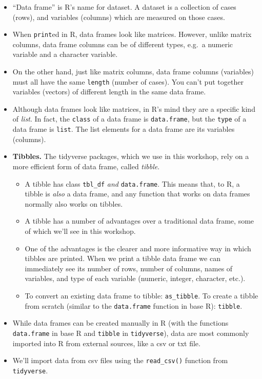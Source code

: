 \documentclass[
]{book}
\providecommand{\tightlist}{%
  \setlength{\itemsep}{0pt}\setlength{\parskip}{0pt}}
\begin{document}
\begin{itemize}
\tightlist
\item
  ``Data frame'' is R's name for dataset. A dataset is a collection of cases (rows), and variables (columns) which are measured on those cases.
\item
  When \texttt{print}ed in R, data frames look like matrices. However, unlike matrix columns, data frame columns can be of different types, e.g.~a numeric variable and a character variable.
\item
  On the other hand, just like matrix columns, data frame columns (variables) must all have the same \texttt{length} (number of cases). You can't put together variables (vectors) of different length in the same data frame.
\item
  Although data frames look like matrices, in R's mind they are a specific kind of \emph{list}. In fact, the \texttt{class} of a data frame is \texttt{data.frame}, but the \texttt{type} of a data frame is \texttt{list}. The list elements for a data frame are its variables (columns).
\item
  \textbf{Tibbles.} The tidyverse packages, which we use in this workshop, rely on a more efficient form of data frame, called \emph{tibble}.

  \begin{itemize}
  \tightlist
  \item
    A tibble has class \texttt{tbl\_df} \emph{and} \texttt{data.frame}. This means that, to R, a tibble is \emph{also} a data frame, and any function that works on data frames normally also works on tibbles.
  \item
    A tibble has a number of advantages over a traditional data frame, some of which we'll see in this workshop.
  \item
    One of the advantages is the clearer and more informative way in which tibbles are printed. When we print a tibble data frame we can immediately see its number of rows, number of columns, names of variables, and type of each variable (numeric, integer, character, etc.).
  \item
    To convert an existing data frame to tibble: \texttt{as\_tibble}. To create a tibble from scratch (similar to the \texttt{data.frame} function in base R): \texttt{tibble}.
  \end{itemize}
\item
  While data frames can be created manually in R (with the functions \texttt{data.frame} in base R and \texttt{tibble} in \texttt{tidyverse}), data are most commonly imported into R from external sources, like a csv or txt file.
\item
  We'll import data from csv files using the \texttt{read\_csv()} function from \texttt{tidyverse}.


\end{itemize}
\end{document}
